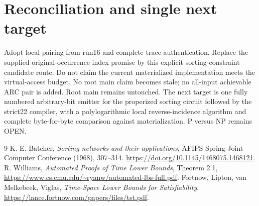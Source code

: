 \documentclass[11pt]{article}
\begin{document}
\section{Reconciliation and single next target}
Adopt local pairing from run16 and complete trace authentication.
Replace the supplied original-occurrence index promise by this explicit
sorting-constraint candidate route. Do not claim the current materialized
implementation meets the virtual-access budget. No root main claim becomes
stale; no all-input achievable ARC pair is added. Root main remains untouched.
The next target is one fully numbered arbitrary-bit emitter for the
properized sorting circuit followed by the strict22 compiler, with a
polylogarithmic local reverse-incidence algorithm and complete byte-for-byte
comparison against materialization. P versus NP remains OPEN.

\begin{thebibliography}{9}
 K. E. Batcher, \emph{Sorting networks and their applications},
AFIPS Spring Joint Computer Conference (1968), 307--314.
\url{https://doi.org/10.1145/1468075.1468121}.
 R. Williams, \emph{Automated Proofs of Time Lower Bounds},
Theorem 2.1, \url{https://www.cs.cmu.edu/~ryanw/automated-lbs-full.pdf}.
 Fortnow, Lipton, van Melkebeek, Viglas,
\emph{Time-Space Lower Bounds for Satisfiability},
\url{https://lance.fortnow.com/papers/files/tst.pdf}.
\end{thebibliography}
\end{document}

